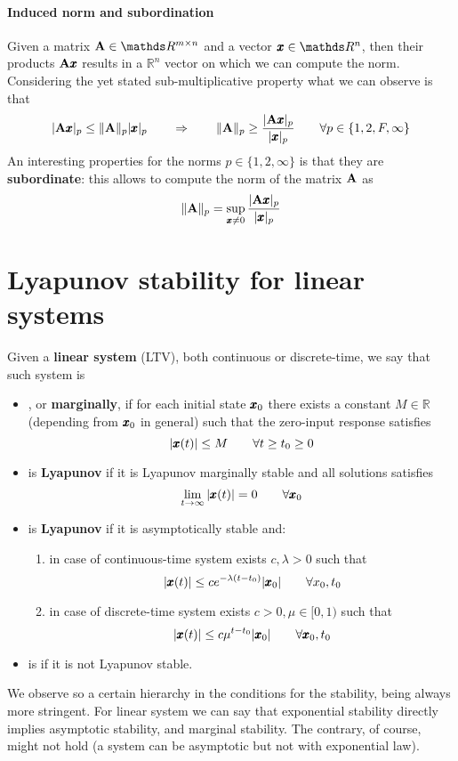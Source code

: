 	\paragraph{Induced norm and subordination} Given a matrix $\A \in \mathds R^{m\times n}$ and a vector $\x \in \mathds R^n$, then their products $\mathbf{A}\pmb{x}$ results in a $\mathds R^n$ vector on which we can compute the norm. Considering the yet stated sub-multiplicative property what we can observe is that
	\[ |\mathbf{A} \pmb{x} |_p \leq \|\mathbf{A}\|_p |\pmb{x}|_p \qquad \Rightarrow \qquad \|\mathbf{A}\|_p \geq \frac{|\mathbf{A} \pmb{x}|_p}{|\pmb{x}|_p} \qquad \forall p \in \{ 1,2,F,\infty \} \]
	An interesting properties for the norms $p\in\{1,2,\infty\}$ is that they are \textbf{subordinate}: this allows to compute the norm of the matrix $\mathbf{A}$ as
	\[ \|\mathbf{A}\|_p = \sup_{\pmb{x}\neq 0} \frac{|\mathbf{A}\pmb{x}|_p}{|\pmb{x}|_p} \]

\section{Lyapunov stability for linear systems}
	Given a \textbf{linear system} (LTV), both continuous or discrete-time, we say that such system is
	\begin{itemize}
		\item {}, or \textbf{marginally},  if for each initial state $\pmb{x}_0$ there exists a constant $M\in \mathds R$ (depending from $\pmb{x}_0$ in general) such that the zero-input response satisfies
		\[ |\pmb{x}(t)| \leq M \qquad \forall t \geq t_0 \geq 0 \]
		\item is \textbf{Lyapunov}  if it is Lyapunov marginally stable and all solutions satisfies
		\[ \lim_{t\rightarrow\infty} |\pmb{x}(t)| = 0 \qquad \forall \pmb{x}_0 \]
		\item is \textbf{Lyapunov}  if it is asymptotically stable and:
		\begin{enumerate}[\itshape (a)]
			\item in case of continuous-time system exists $c,\lambda >0$ such that
			\[ |\pmb{x}(t)| \leq c e^{-\lambda(t-t_0)} |\pmb{x}_0| \qquad \forall x_0,t_0 \]
			\item in case of discrete-time system exists $c>0, \mu \in [0,1)$ such that
			\[ |\pmb{x}(t)| \leq c \mu^{t-t_0}|\pmb{x}_0| \qquad \forall \pmb{x}_0,t_0 \]
		\end{enumerate}
		\item is  if it is not Lyapunov stable.		
	\end{itemize}
	We observe so a certain hierarchy in the conditions for the stability, being always more stringent. For linear system we can say that exponential stability directly implies asymptotic stability, and marginal stability. The contrary, of course, might not hold (a system can be asymptotic but not with exponential law).
	
